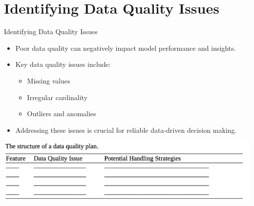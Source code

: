 \documentclass[aspectratio=169,xcolor=dvipsnames]{beamer}
\begin{document}
\section{Identifying Data Quality Issues}
\begin{frame}{Identifying Data Quality Issues}
\begin{itemize}
    \setlength\itemsep{0.25cm}
    \item Poor data quality can negatively impact model performance and insights.
    \item Key data quality issues include:
    \begin{itemize}
        \item Missing values
        \item Irregular cardinality
        \item Outliers and anomalies
    \end{itemize}
    \item Addressing these issues is crucial for reliable data-driven decision making.
\end{itemize}
\vspace{0.1cm}
\centering
\includegraphics[scale=0.33]{images/data_quality_plan.png}
\end{frame}
\end{document}
